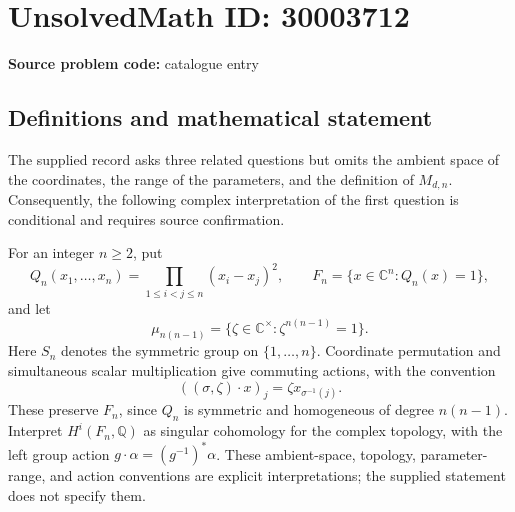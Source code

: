 \documentclass[11pt]{article}
\newcommand{\Q}{\mathbb{Q}}
\newcommand{\C}{\mathbb{C}}
\begin{document}
\section*{UnsolvedMath ID: 30003712}
\textbf{Source problem code:} catalogue entry
\subsection{Definitions and mathematical statement}
The supplied record asks three related questions but omits the ambient space of the coordinates, the range of the parameters, and the definition of \(M_{d,n}\). Consequently, the following complex interpretation of the first question is conditional and requires source confirmation.

For an integer \(n\geq 2\), put
\[
Q_n(x_1,\ldots,x_n)=\prod_{1\leq i<j\leq n}(x_i-x_j)^2,
\qquad
F_n=\{x\in\C^n:Q_n(x)=1\},
\]
and let
\[
\mu_{n(n-1)}=\{\zeta\in\C^\times:\zeta^{n(n-1)}=1\}.
\]
Here \(S_n\) denotes the symmetric group on \(\{1,\ldots,n\}\). Coordinate permutation and simultaneous scalar multiplication give commuting actions, with the convention
\[
((\sigma,\zeta)\cdot x)_j=\zeta x_{\sigma^{-1}(j)}.
\]
These preserve \(F_n\), since \(Q_n\) is symmetric and homogeneous of degree \(n(n-1)\). Interpret \(H^i(F_n,\Q)\) as singular cohomology for the complex topology, with the left group action \(g\cdot\alpha=(g^{-1})^*\alpha\). These ambient-space, topology, parameter-range, and action conventions are explicit interpretations; the supplied statement does not specify them.
\end{document}
